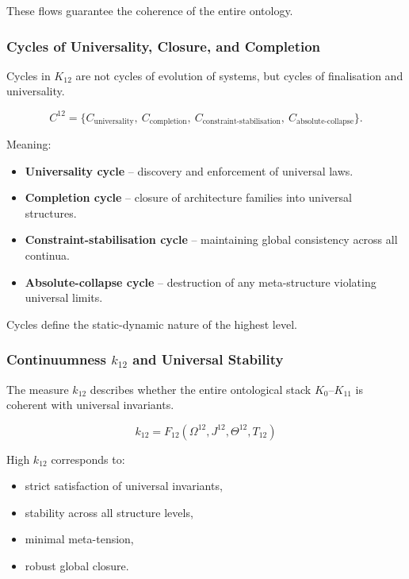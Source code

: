 These flows guarantee the coherence of the entire ontology.

\subsubsection{Cycles of Universality, Closure, and Completion}

Cycles in $K_{12}$ are not cycles of evolution of systems,
but cycles of finalisation and universality.

\[
C^{12} = \{
C_{\text{universality}},\
C_{\text{completion}},\
C_{\text{constraint-stabilisation}},\
C_{\text{absolute-collapse}}
\}.
\]

Meaning:
\begin{itemize}
    \item \textbf{Universality cycle}
      -- discovery and enforcement of universal laws.

    \item \textbf{Completion cycle}
      -- closure of architecture families into universal structures.

    \item \textbf{Constraint-stabilisation cycle}
      -- maintaining global consistency across all continua.

    \item \textbf{Absolute-collapse cycle}
      -- destruction of any meta-structure violating universal limits.
\end{itemize}

Cycles define the static-dynamic nature of the highest level.

\subsubsection{Continuumness $k_{12}$ and Universal Stability}

The measure $k_{12}$ describes whether
the entire ontological stack $K_0$--$K_{11}$
is coherent with universal invariants.

\[
k_{12} = F_{12}(\Omega^{12}, J^{12}, \Theta^{12}, T_{12})
\]

High $k_{12}$ corresponds to:
\begin{itemize}
    \item strict satisfaction of universal invariants,
    \item stability across all structure levels,
    \item minimal meta-tension,
    \item robust global closure.
\end{itemize}

